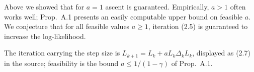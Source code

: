 Above we showed that for $a=1$ ascent is guaranteed.  Empirically, $a>1$ often works well; Prop.~A.1 presents an easily computable upper bound on feasible $a$.  We conjecture that for all feasible values $a\ge1$, iteration (2.5) is guaranteed to increase the log-likelihood.

The iteration carrying the step size is $L_{k+1}=L_k+aL_k\Delta_kL_k$, displayed as (2.7) in the source; feasibility is the bound $a\le1/(1-\gamma)$ of Prop.~A.1.
